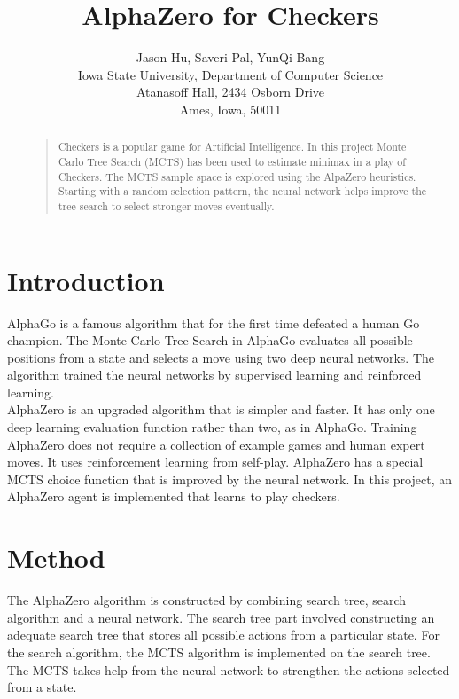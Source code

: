 \documentclass[letterpaper]{article}
\begin{document}
%
\title{AlphaZero for Checkers}
\author{Jason Hu, Saveri Pal, YunQi Bang\\
Iowa State University, Department of Computer Science\\
Atanasoff Hall, 2434 Osborn Drive\\
Ames, Iowa, 50011\\
}
\maketitle
\begin{abstract}
\begin{quote}
Checkers is a popular game for Artificial Intelligence. In this project Monte Carlo Tree Search (MCTS) has been used to estimate minimax in a play of Checkers. The MCTS sample space is explored using the AlpaZero heuristics. Starting with a random selection pattern, the neural network helps improve the tree search to select stronger moves eventually.
\end{quote}
\end{abstract}

\section{Introduction}
AlphaGo is a famous algorithm that for the first time defeated a human Go champion. The Monte Carlo Tree Search in AlphaGo evaluates all possible positions from a state and selects a move using two deep neural networks. The algorithm trained the neural networks by supervised learning and reinforced learning. \\
AlphaZero is an upgraded algorithm that is simpler and faster. It has only one deep learning evaluation function rather than two, as in AlphaGo. Training AlphaZero does not require a collection of example games and human expert moves. It uses reinforcement learning from self-play. AlphaZero has a special MCTS choice function that is improved by the neural network.
In this project, an AlphaZero agent is implemented that learns to play checkers. 


\section{Method}
The AlphaZero algorithm is constructed by combining search tree, search algorithm and a neural network. The search tree part involved constructing an adequate search tree that stores all possible actions from a particular state. For the search algorithm, the MCTS algorithm is implemented on the search tree. The MCTS takes help from the neural network to strengthen the actions selected from a state.
\end{document}
